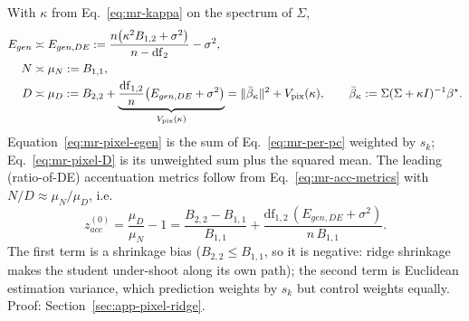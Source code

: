 \begin{prop}
\label{prop:mr-pixel-de}
With $\kappa$ from Eq.~\ref{eq:mr-kappa} on the spectrum of $\Sigma$,
\begin{align}
E_{gen}&\asymp E_{gen,DE}:=\frac{n\big(\kappa^2B_{1,2}+\sigma^2\big)}{n-\mathrm{df}_2}-\sigma^2,
\label{eq:mr-pixel-egen}\\
N&\asymp\mu_N:=B_{1,1},
\label{eq:mr-pixel-N}\\
D&\asymp\mu_D:=B_{2,2}+\underbrace{\frac{\mathrm{df}_{1,2}}{n}\big(E_{gen,DE}+\sigma^2\big)}_{V_{\rm pix}(\kappa)}
=\|\bar\beta_\kappa\|^2+V_{\rm pix}(\kappa),\qquad \bar\beta_\kappa:=\Sigma(\Sigma+\kappa I)^{-1}{\beta^{\star}} .
\label{eq:mr-pixel-D}
\end{align}
Equation~\ref{eq:mr-pixel-egen} is the sum of Eq.~\ref{eq:mr-per-pc}
weighted by $s_k$; Eq.~\ref{eq:mr-pixel-D} is its unweighted sum plus the
squared mean.  The leading (ratio-of-DE) accentuation metrics follow from
Eq.~\ref{eq:mr-acc-metrics} with $N/D\approx\mu_N/\mu_D$, i.e.
\begin{equation}
z^{(0)}_{acc}=\frac{\mu_D}{\mu_N}-1
=\frac{B_{2,2}-B_{1,1}}{B_{1,1}}
+\frac{\mathrm{df}_{1,2}\,(E_{gen,DE}+\sigma^2)}{n\,B_{1,1}} .
\label{eq:mr-pixel-z}
\end{equation}
The first term is a shrinkage bias ($B_{2,2}\le B_{1,1}$, so it is negative:
ridge shrinkage makes the student under-shoot along its own path); the
second term is Euclidean estimation variance, which prediction weights by
$s_k$ but control weights equally.
Proof: Section~\ref{sec:app-pixel-ridge}.
\end{prop}

